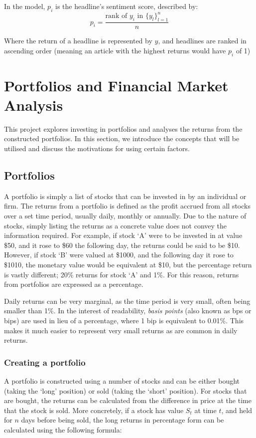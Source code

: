 \documentclass[ oneside,%
                    author={Joshua Felmeden},
                    degree={MEng},
                     title={Semantic Analysis of Financial Headlines Based on Realised Stock Returns},
                  subtitle={}]{dissertation}
\begin{document}
In the model, $p_i$ is the headline's sentiment score, described by:
\begin{equation}
p_i = \frac{\text{rank of } y_i \text{ in } \{y_l\}_{l=1}^n}{n}
\end{equation}

Where the return of a headline is represented by $y$, and headlines are ranked in ascending order (meaning an article with the highest returns would have $p_i$ of 1)


\section{Portfolios and Financial Market Analysis}
This project explores investing in portfolios and analyses the returns from the constructed portfolios. In this section, we introduce the concepts that will be utilised and discuss the motivations for using certain factors.

\subsection{Portfolios}
A portfolio is simply a list of stocks that can be invested in by an individual or firm. The returns from a portfolio is defined as the profit accrued from all stocks over a set time period, usually daily, monthly or annually. Due to the nature of stocks, simply listing the returns as a concrete value does not convey the information required. For example, if stock `A' were to be invested in at value \$50, and it rose to \$60 the following day, the returns could be said to be \$10. However, if stock `B' were valued at \$1000, and the following day it rose to \$1010, the monetary value would be equivalent at \$10, but the percentage return is vastly different; 20\% returns for stock `A' and 1\%. For this reason, returns from portfolios are expressed as a percentage.

Daily returns can be very marginal, as the time period is very small, often being smaller than 1\%. In the interest of readability, \textit{basis points} (also known as bps or bips) are used in lieu of a percentage, where 1 bip is equivalent to 0.01\%. This makes it much easier to represent very small returns as are common in daily returns.

\subsubsection{Creating a portfolio}
A portfolio is constructed using a number of stocks and can be either bought (taking the `long' position) or sold (taking the `short' position). For stocks that are bought, the returns can be calculated from the difference in price at the time that the stock is sold. More concretely, if a stock has value $S_{t}$ at time $t$, and held for $n$ days before being sold, the long returns in percentage form can be calculated using the following formula:
\end{document}
